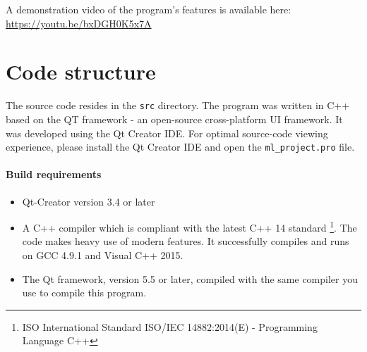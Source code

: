 \documentclass[12pt,a4paper]{article}
\begin{document}
A demonstration video of the program's features is available here: \\
\href{https://youtu.be/bxDGH0K5x7A}{https://youtu.be/bxDGH0K5x7A}

\section{Code structure}
The source code resides in the \texttt{src} directory. The program was written in C++ based on the QT framework - an open-source cross-platform UI framework. It was developed using the Qt Creator IDE. For optimal source-code viewing experience, please install the Qt Creator IDE and open the \texttt{ml\_project.pro} file.

\paragraph{Build requirements}
\begin{itemize}
	\item Qt-Creator version 3.4 or later
	\item A C++ compiler which is compliant with the latest C++ 14 standard \footnote{ISO International Standard ISO/IEC 14882:2014(E) - Programming Language C++}. The code makes heavy use of modern features. It successfully compiles and runs on GCC 4.9.1 and Visual C++ 2015.
	\item The Qt framework, version 5.5 or later, compiled with the same compiler you use to compile this program.
\end{itemize}
\end{document}
